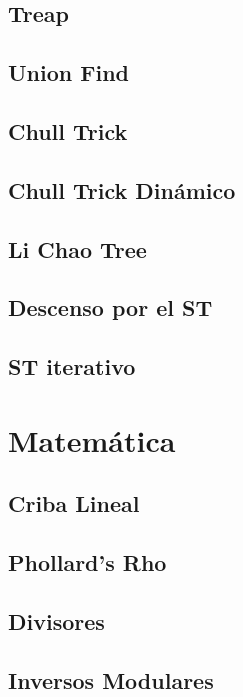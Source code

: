 \documentclass[a4paper,10pt,twocolumn]{article}
\begin{document}
\subsection{Treap}

\subsection{Union Find}

\subsection{Chull Trick}

\subsection{Chull Trick Dinámico}

\subsection{Li Chao Tree}

\subsection{Descenso por el ST}

\subsection{ST iterativo}


\section{Matemática} %
\subsection{Criba Lineal}

\subsection{Phollard's Rho}

\subsection{Divisores}

\subsection{Inversos Modulares}


\end{document}
